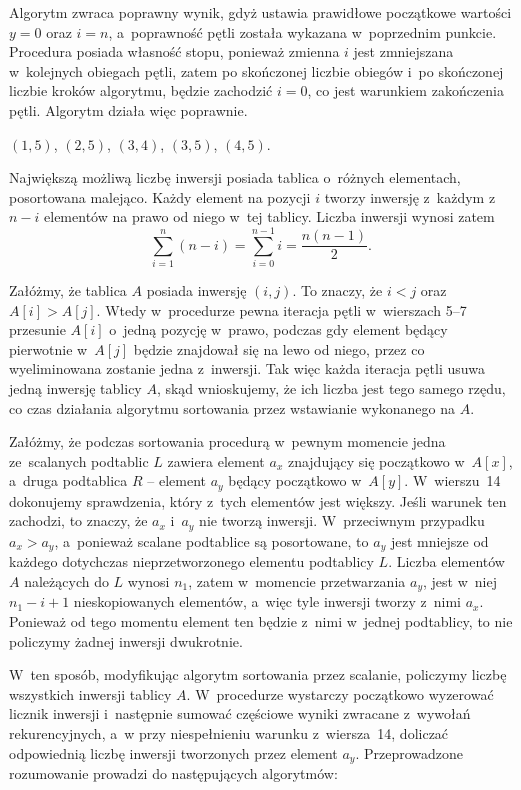 \subexercise{} %
Algorytm zwraca poprawny wynik, gdyż ustawia prawidłowe początkowe wartości $y=0$ oraz $i=n$, a~poprawność pętli  została wykazana w~poprzednim punkcie. Procedura posiada własność stopu, ponieważ zmienna $i$ jest zmniejszana w~kolejnych obiegach pętli, zatem po skończonej liczbie obiegów i~po skończonej liczbie kroków algorytmu, będzie zachodzić $i=0$, co jest warunkiem zakończenia pętli. Algorytm działa więc poprawnie.


\subexercise{} %
$(1,5)$, $(2,5)$, $(3,4)$, $(3,5)$, $(4,5)$.

\subexercise{} %
Największą możliwą liczbę inwersji posiada tablica o~różnych elementach, posortowana malejąco. Każdy element na pozycji $i$ tworzy inwersję z~każdym z~$n-i$ elementów na prawo od niego w~tej tablicy. Liczba inwersji wynosi zatem
\[
	\sum_{i=1}^n(n-i) = \sum_{i=0}^{n-1}i = \frac{n(n-1)}{2}.
\]

\subexercise{} %
Załóżmy, że tablica $A$ posiada inwersję $(i,j)$. To znaczy, że $i<j$ oraz $A[i]>A[j]$. Wtedy w~procedurze  pewna iteracja pętli  w~wierszach 5\nobreakdash--7 przesunie $A[i]$ o~jedną pozycję w~prawo, podczas gdy element będący pierwotnie w~$A[j]$ będzie znajdował się na lewo od niego, przez co wyeliminowana zostanie jedna z~inwersji. Tak więc każda iteracja pętli  usuwa jedną inwersję tablicy $A$, skąd wnioskujemy, że ich liczba jest tego samego rzędu, co czas działania algorytmu sortowania przez wstawianie wykonanego na $A$.

\subexercise{} %
Załóżmy, że podczas sortowania procedurą  w~pewnym momencie jedna ze~scalanych podtablic $L$ zawiera element $a_x$ znajdujący się początkowo w~$A[x]$, a~druga podtablica $R$ -- element $a_y$ będący początkowo w~$A[y]$. W~wierszu~14 dokonujemy sprawdzenia, który z~tych elementów jest większy. Jeśli warunek ten zachodzi, to znaczy, że $a_x$ i~$a_y$ nie tworzą inwersji. W~przeciwnym przypadku $a_x>a_y$, a~ponieważ scalane podtablice są posortowane, to $a_y$ jest mniejsze od każdego dotychczas nieprzetworzonego elementu podtablicy $L$. Liczba elementów $A$ należących do $L$ wynosi $n_1$, zatem w~momencie przetwarzania $a_y$, jest w~niej $n_1-i+1$ nieskopiowanych elementów, a~więc tyle inwersji tworzy z~nimi $a_x$. Ponieważ od tego momentu element ten będzie z~nimi w~jednej podtablicy, to nie policzymy żadnej inwersji dwukrotnie.

W~ten sposób, modyfikując algorytm sortowania przez scalanie, policzymy liczbę wszystkich inwersji tablicy $A$. W~procedurze  wystarczy początkowo wyzerować licznik inwersji i~następnie sumować częściowe wyniki zwracane z~wywołań rekurencyjnych, a~w  przy niespełnieniu warunku z~wiersza~14, doliczać odpowiednią liczbę inwersji tworzonych przez element $a_y$. Przeprowadzone rozumowanie prowadzi do następujących algorytmów:

